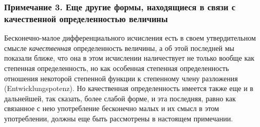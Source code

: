 \bigskip

\subsubsection[Примечание 3. Еще другие формы, находящиеся в связи с качественной определенностью величины]
{Примечание 3. Еще другие формы, находящиеся в связи с качественной определенностью величины}
\label{bkm:bm53a}

Бесконечно-малое дифференциального исчисления есть в своем утвердительном
смысле {\em качественная} определенность величины, а об
этой последней мы показали ближе, что она в этом исчислении наличествует не
только вообще как степенная определенность, но как особенная степенная
определенность отношения некоторой степенной функции к степенному члену
разложения (Entwicklungspotenz).
Но качественная определенность
имеется также еще и в дальнейшей, так сказать, более слабой форме, и эта
последняя, равно как связанное с нею употребление бесконечно малых и их
смысл в этом употреблении, должны еще быть рассмотрены в настоящем
примечании.

